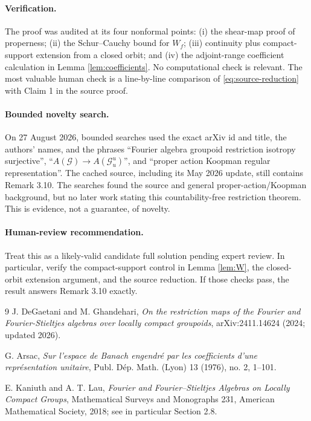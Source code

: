 \documentclass[11pt]{article}
\theoremstyle{remark}
\newcommand{\G}{\mathcal G}
\begin{document}
\paragraph{Verification.}
The proof was audited at its four nonformal points: (i) the shear-map proof of
properness; (ii) the Schur--Cauchy bound for $W_f$; (iii) continuity plus
compact-support extension from a closed orbit; and (iv) the adjoint-range
coefficient calculation in Lemma \ref{lem:coefficients}. No computational
check is relevant. The most valuable human check is a line-by-line comparison
of \eqref{eq:source-reduction} with Claim 1 in the source proof.

\paragraph{Bounded novelty search.}
On 27 August 2026, bounded searches used the exact arXiv id and title, the
authors' names, and the phrases ``Fourier algebra groupoid restriction
isotropy surjective'', ``$A(\G)\to A(\G_u^u)$'', and ``proper action Koopman
regular representation''.  The cached source, including its May 2026 update,
still contains Remark 3.10. The searches found the source and general
proper-action/Koopman background, but no later work stating this
countability-free restriction theorem. This is evidence, not a guarantee, of
novelty.

\paragraph{Human-review recommendation.}
Treat this as a likely-valid candidate full solution pending expert review.
In particular, verify the compact-support control in Lemma \ref{lem:W}, the
closed-orbit extension argument, and the source reduction. If those checks
pass, the result answers Remark 3.10 exactly.

\begin{thebibliography}{9}
J. DeGaetani and M. Ghandehari,
\emph{On the restriction maps of the Fourier and Fourier-Stieltjes algebras
over locally compact groupoids}, arXiv:2411.14624 (2024; updated 2026).

G. Arsac, \emph{Sur l'espace de Banach engendr\'{e} par les coefficients
d'une repr\'{e}sentation unitaire}, Publ. D\'{e}p. Math. (Lyon) 13 (1976),
no. 2, 1--101.

E. Kaniuth and A. T. Lau, \emph{Fourier and Fourier--Stieltjes Algebras on
Locally Compact Groups}, Mathematical Surveys and Monographs 231, American
Mathematical Society, 2018; see in particular Section 2.8.
\end{thebibliography}
\end{document}
